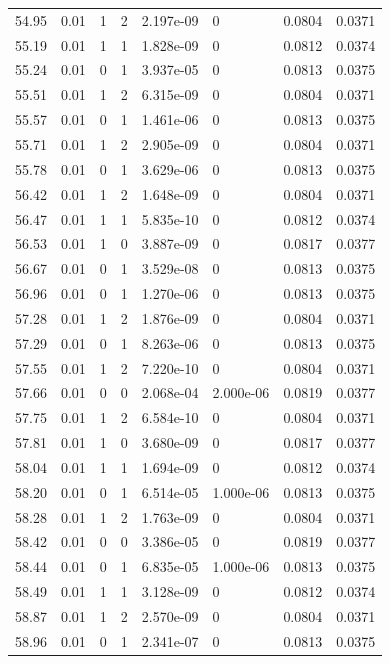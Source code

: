 \documentclass[preview]{standalone}
\begin{document}
{{{{{{{{\begin{tabular}{L{1.2cm}C{1.2cm} C{0.3cm}C{0.5cm} C{1.4cm}C{1.4cm} C{1.4cm}C{1.4cm}}
  54.95  &  0.01  & 1     &  2 &  2.197e-09  & 0  & 0.0804 &  0.0371   \\ 
  55.19  &  0.01  & 1     &  1 &  1.828e-09  & 0  & 0.0812 &  0.0374   \\ 
  55.24  &  0.01  & 0     &  1 &  3.937e-05  & 0  & 0.0813 &  0.0375   \\ 
  55.51  &  0.01  & 1     &  2 &  6.315e-09  & 0  & 0.0804 &  0.0371   \\ 
  55.57  &  0.01  & 0     &  1 &  1.461e-06  & 0  & 0.0813 &  0.0375   \\ 
  55.71  &  0.01  & 1     &  2 &  2.905e-09  & 0  & 0.0804 &  0.0371   \\ 
  55.78  &  0.01  & 0     &  1 &  3.629e-06  & 0  & 0.0813 &  0.0375   \\ 
  56.42  &  0.01  & 1     &  2 &  1.648e-09  & 0  & 0.0804 &  0.0371   \\ 
  56.47  &  0.01  & 1     &  1 &  5.835e-10  & 0  & 0.0812 &  0.0374   \\ 
  56.53  &  0.01  & 1     &  0 &  3.887e-09  & 0  & 0.0817 &  0.0377   \\ 
  56.67  &  0.01  & 0     &  1 &  3.529e-08  & 0  & 0.0813 &  0.0375   \\ 
  56.96  &  0.01  & 0     &  1 &  1.270e-06  & 0  & 0.0813 &  0.0375   \\ 
  57.28  &  0.01  & 1     &  2 &  1.876e-09  & 0  & 0.0804 &  0.0371   \\ 
  57.29  &  0.01  & 0     &  1 &  8.263e-06  & 0  & 0.0813 &  0.0375   \\ 
  57.55  &  0.01  & 1     &  2 &  7.220e-10  & 0  & 0.0804 &  0.0371   \\ 
  57.66  &  0.01  & 0     &  0 &  2.068e-04  & 2.000e-06  & 0.0819 &  0.0377   \\ 
  57.75  &  0.01  & 1     &  2 &  6.584e-10  & 0  & 0.0804 &  0.0371   \\ 
  57.81  &  0.01  & 1     &  0 &  3.680e-09  & 0  & 0.0817 &  0.0377   \\ 
  58.04  &  0.01  & 1     &  1 &  1.694e-09  & 0  & 0.0812 &  0.0374   \\ 
  58.20  &  0.01  & 0     &  1 &  6.514e-05  & 1.000e-06  & 0.0813 &  0.0375   \\ 
  58.28  &  0.01  & 1     &  2 &  1.763e-09  & 0  & 0.0804 &  0.0371   \\ 
  58.42  &  0.01  & 0     &  0 &  3.386e-05  & 0  & 0.0819 &  0.0377   \\ 
  58.44  &  0.01  & 0     &  1 &  6.835e-05  & 1.000e-06  & 0.0813 &  0.0375   \\ 
  58.49  &  0.01  & 1     &  1 &  3.128e-09  & 0  & 0.0812 &  0.0374   \\ 
  58.87  &  0.01  & 1     &  2 &  2.570e-09  & 0  & 0.0804 &  0.0371   \\ 
  58.96  &  0.01  & 0     &  1 &  2.341e-07  & 0  & 0.0813 &  0.0375   \\ 
\hline 
\end{tabular} 

}}}}}}}}
\end{document}
